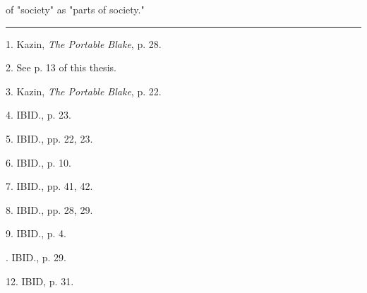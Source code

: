 of "society" as "parts of society."\linebreak
\null\par
\vspace*{-\baselineskip}
\vspace*{\fill}
\noindent\rule{0.25\textwidth}{0.4pt}\par
1. Kazin, \textit{The Portable Blake}, p. 28.\par
2. See p. 13 of this thesis.\par
3. Kazin, \textit{The Portable Blake}, p. 22.\par
4. IBID., p. 23.\par
5. IBID., pp. 22, 23.\par
6. IBID., p. 10.\par
7. IBID., pp. 41, 42.\par
8. IBID., pp. 28, 29.\par
9. IBID., p. 4.\par
[10, 11]. IBID., p. 29.\par
12. IBID, p. 31.\par

\newpage

